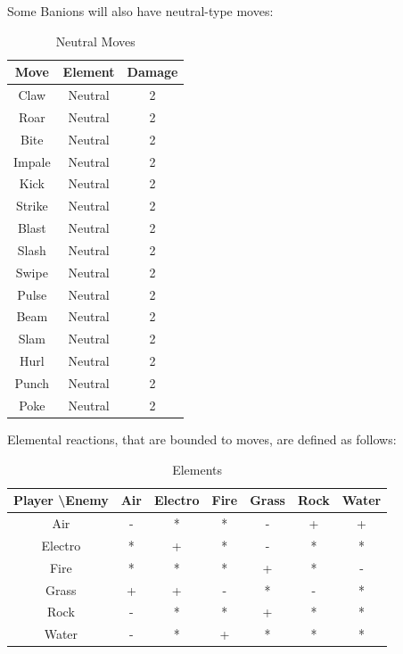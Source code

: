 \documentclass[12pt, a4paper]{report}
\theoremstyle{definition}
\begin{document}
    \pagebreak
    Some Banions will also have neutral-type moves:

\begin{table}[H]
    \begin{center}
    \begin{tabular}{| c | c | c |}
        \hline
        Move & Element & Damage \\
        \hline \hline
        Claw & Neutral & 2 \\
        \hline
        Roar & Neutral & 2 \\
        \hline
        Bite & Neutral & 2 \\
        \hline
        Impale & Neutral & 2 \\
        \hline
        Kick & Neutral & 2 \\
        \hline
        Strike & Neutral & 2 \\
        \hline
        Blast & Neutral & 2 \\
        \hline
        Slash & Neutral & 2 \\
        \hline
        Swipe & Neutral & 2 \\
        \hline
        Pulse & Neutral & 2 \\
        \hline
        Beam & Neutral & 2 \\
        \hline
        Slam & Neutral & 2 \\
        \hline
        Hurl & Neutral & 2 \\
        \hline
        Punch & Neutral & 2 \\
        \hline
        Poke & Neutral & 2 \\
        \hline
    \end{tabular}
    \caption{\label{table:neutralMoves} Neutral Moves}
    \end{center}
\end{table}

    Elemental reactions, that are bounded to moves, are defined as follows:

\begin{table}[ht]
    \begin{center}
    \begin{tabular}{| c || c | c | c | c | c | c |}
        \hline
        Player \textbackslash Enemy & Air & Electro & Fire & Grass & Rock & Water \\ [0.5ex]
        \hline\hline
        Air         & - & * & * & - & + & + \\
        \hline
        Electro     & * & + & * & - & * & * \\
        \hline
        Fire        & * & * & * & + & * & - \\
        \hline
        Grass       & + & + & - & * & - & * \\
        \hline
        Rock        & - & * & * & + & * & * \\
        \hline
        Water       & - & * & + & * & * & * \\
        \hline
    \end{tabular}
    \caption{\label{table:elements} Elements}
    \end{center}
\end{table}
\end{document}

